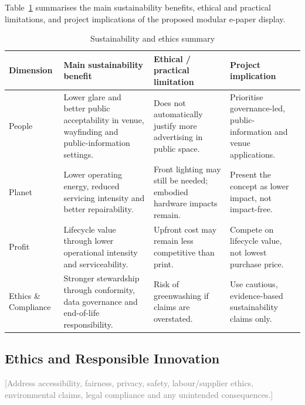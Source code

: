\documentclass[11pt,a4paper]{article}
\renewcommand{\arraystretch}{1.12}
\newcommand{\placeholder}[1]{\textcolor{gray}{#1}}
\begin{document}
Table~\ref{tab:sustainability-ethics-summary} summarises the main sustainability benefits, ethical and practical limitations, and project implications of the proposed modular e-paper display.

\begin{table}[H]
\centering
\caption{Sustainability and ethics summary}
\label{tab:sustainability-ethics-summary}
\renewcommand{\arraystretch}{1.35}
\setlength{\tabcolsep}{4pt}
\small

\begin{tabularx}{\textwidth}{|p{2.1cm}|X|X|X|}
\hline
\textbf{Dimension} & 
\textbf{Main sustainability benefit} & 
\textbf{Ethical / practical limitation} & 
\textbf{Project implication} \\
\hline

People &
Lower glare and better public acceptability in venue, wayfinding and public-information settings. &
Does not automatically justify more advertising in public space. &
Prioritise governance-led, public-information and venue applications. \\
\hline

Planet &
Lower operating energy, reduced servicing intensity and better repairability. &
Front lighting may still be needed; embodied hardware impacts remain. &
Present the concept as lower impact, not impact-free. \\
\hline

Profit &
Lifecycle value through lower operational intensity and serviceability. &
Upfront cost may remain less competitive than print. &
Compete on lifecycle value, not lowest purchase price. \\
\hline

Ethics \& Compliance &
Stronger stewardship through conformity, data governance and end-of-life responsibility. &
Risk of greenwashing if claims are overstated. &
Use cautious, evidence-based sustainability claims only. \\
\hline

\end{tabularx}

\normalsize
\end{table}

\subsection{Ethics and Responsible Innovation}
\placeholder{[Address accessibility, fairness, privacy, safety, labour/supplier ethics, environmental claims, legal compliance and any unintended consequences.]}
\end{document}
